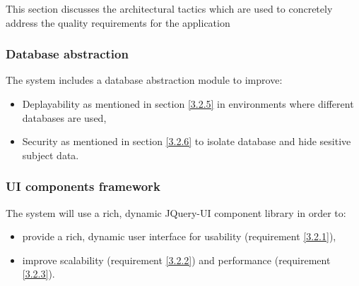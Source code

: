 This section discusses the architectural tactics which are used to concretely address the quality
requirements for the application

\subsubsection{Database abstraction}
The system includes a database abstraction module to improve:
\begin {itemize}
\item Deplayability as mentioned in section \ref {3.2.5} in environments where different databases are used,
\item Security as mentioned in section \ref {3.2.6} to isolate database and hide sesitive subject data.
\end {itemize}

\subsubsection{UI components framework}
The system will use a rich, dynamic JQuery-UI component library in order to:
\begin {itemize}
\item provide a rich, dynamic user interface for usability (requirement \ref {3.2.1}),
\item improve scalability (requirement \ref {3.2.2}) and performance (requirement \ref {3.2.3}).
\end{itemize}